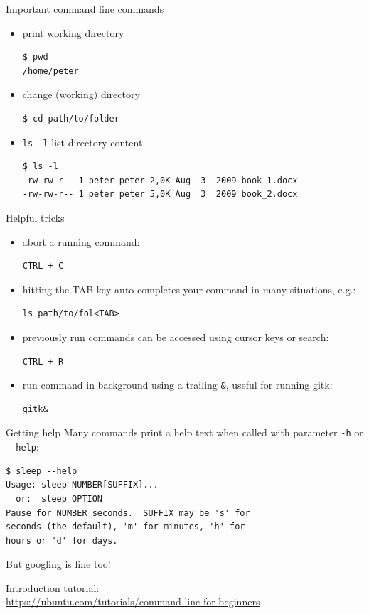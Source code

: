 \begin{frame}[fragile]{Important command line commands}
    \begin{itemize}
        \item print working directory
\begin{verbatim}$ pwd
/home/peter
\end{verbatim}
        \item change (working) directory
\begin{verbatim}$ cd path/to/folder\end{verbatim}
        \item \verb|ls -l| list directory content
\begin{verbatim}$ ls -l
-rw-rw-r-- 1 peter peter 2,0K Aug  3  2009 book_1.docx
-rw-rw-r-- 1 peter peter 5,0K Aug  3  2009 book_2.docx
\end{verbatim}
    \end{itemize}
\end{frame}


\begin{frame}[fragile]{Helpful tricks}
    \begin{itemize}
        \item abort a running command:
            \begin{verbatim}CTRL + C\end{verbatim}
        \item hitting the TAB key auto-completes your command in many situations, e.g.:
            \begin{verbatim}ls path/to/fol<TAB>\end{verbatim}
        \item previously run commands can be accessed using cursor keys or search:
            \begin{verbatim}CTRL + R\end{verbatim}
        \item run command in background using a trailing \verb|&|, useful for running gitk:
            \begin{verbatim}gitk&\end{verbatim}
    \end{itemize}
\end{frame}


\begin{frame}[fragile]{Getting help}
    Many commands print a help text when called with parameter \verb|-h| or \verb|--help|:
\begin{verbatim}$ sleep --help
Usage: sleep NUMBER[SUFFIX]...
  or:  sleep OPTION
Pause for NUMBER seconds.  SUFFIX may be 's' for
seconds (the default), 'm' for minutes, 'h' for
hours or 'd' for days.
\end{verbatim}

\bigskip
\pause

But googling is fine too!

\bigskip
\pause
Introduction tutorial:\\
\href{https://ubuntu.com/tutorials/command-line-for-beginners}{https://ubuntu.com/tutorials/command-line-for-beginners}

\end{frame}


